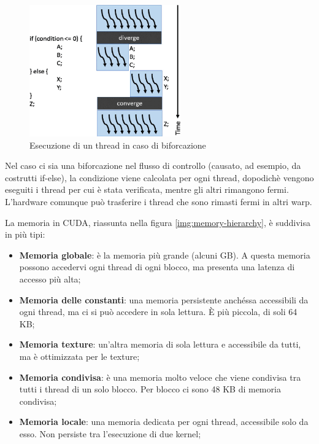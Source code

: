 \documentclass[12pt,a4paper,openright,twoside]{report}
\begin{document}
\begin{figure}[h]
\centering{}
\includegraphics[width=6.5cm]{warp-branch.png}
\caption{Esecuzione di un thread in caso di biforcazione}
\label{img:warp-branch}
\end{figure}

Nel caso ci sia una biforcazione nel flusso di controllo (causato, ad esempio, da costrutti if-else), la condizione viene calcolata per ogni thread, dopodichè vengono eseguiti i thread per cui è stata verificata, mentre gli altri rimangono fermi. L'hardware comunque può trasferire i thread che sono rimasti fermi in altri warp.

\newpage

La memoria in CUDA, riassunta nella figura \ref{img:memory-hierarchy}, è suddivisa in più tipi:

\begin{itemize}
    \item \textbf{Memoria globale}: è la memoria più grande (alcuni GB). A questa memoria possono accedervi ogni thread di ogni blocco, ma presenta una latenza di accesso più alta;
    \item \textbf{Memoria delle constanti}: una memoria persistente anch\'essa accessibili da ogni thread, ma ci si può accedere in sola lettura. È più piccola, di soli 64 KB;
    \item \textbf{Memoria texture}: un'altra memoria di sola lettura e accessibile da tutti, ma è ottimizzata per le texture;
    \item \textbf{Memoria condivisa}: è una memoria molto veloce che viene condivisa tra tutti i thread di un solo blocco. Per blocco ci sono 48 KB di memoria condivisa;
    \item \textbf{Memoria locale}: una memoria dedicata per ogni thread, accessibile solo da esso. Non persiste tra l'esecuzione di due kernel;
\end{itemize}
\end{document}
